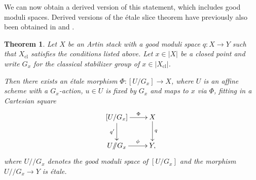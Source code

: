\documentclass[a4paper,twoside,11pt]{amsart}
\theoremstyle{plain}
\newtheorem{theorem}{Theorem}[section]
\theoremstyle{definition}
\theoremstyle{remark}
\numberwithin{equation}{section}
\newcommand{\cl}{\mathrm{cl}} %
\def\git{/\!\!/}
\begin{document}
We can now obtain a derived version of this statement, which includes good moduli spaces. Derived versions of the \'{e}tale slice theorem have previously also been obtained in \cite[Lemma~4.2.5]{HL} and \cite[Theorem~1.13, Proposition~6.1]{FerrandPush}.

\begin{theorem} \label{thm:derived slice thm}
    Let $X$ be an Artin stack with a good moduli space $q\colon X \to Y$ such that $X_\cl$ satisfies the conditions listed above. Let $x \in |X|$ be a closed point and write $G_x$ for the classical stabilizer group of $x \in |X_\cl|$. 
    
    Then there exists an \'{e}tale morphism $\Phi \colon [U / G_x] \to X$, where $U$ is an affine scheme with a $G_x$-action, $u \in U$ is fixed by $G_x$ and maps to $x$ via $\Phi$, fitting in a Cartesian square
    \begin{align*}
        \xymatrix{
        [U / G_x] \ar[d]_-{q'} \ar[r]^-{\Phi} & X \ar[d]^-{q} \\
        U \git G_x \ar[r]^-{\phi} & Y,
        }
    \end{align*}
    where $U \git G_x$ denotes the good moduli space of $[U / G_x]$ and the morphism $U \git G_x \to Y$ is \'{e}tale.
\end{theorem}
\end{document}
